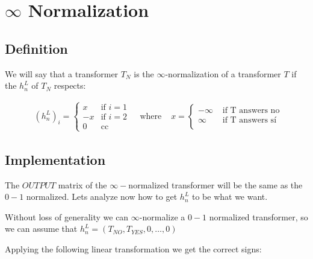 \section*{$\infty$ Normalization}

\subsection*{Definition}

We will say that a transformer $T_N$ is the $\infty$-normalization of a transformer $T$ if the $h_n^L$ of $T_N$ respects:


\begin{align*}
    & (h_n^L)_i =
    \begin{cases}
    x & \text{if } i = 1 \\
    -x & \text{if } i = 2 \\
    0 & \text{cc }
    \end{cases} 
    & \text{ where }
    & x = 
    \begin{cases}
    -\infty & \text{ if T answers no }  \\
    \infty & \text{ if T answers sí } \\
    \end{cases} 
\end{align*}


\subsection*{Implementation}

The $OUTPUT$ matrix of the $\infty-$normalized transformer will be the same as the $0-1$ normalized. Lets analyze now how to get $h_n^L$ to be what we want.

Without loss of generality we can $\infty$-normalize a $0-1$ normalized transformer, so we can assume that $h_n^L = (T_{NO}, T_{YES}, 0, \dots, 0)$

Applying the following linear transformation we get the correct signs:

